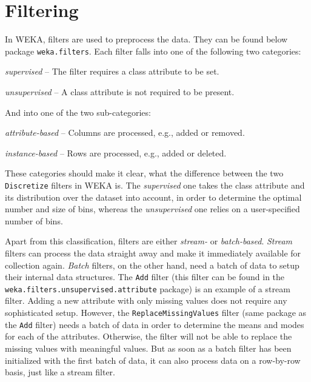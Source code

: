 \newpage

\section{Filtering}
\label{api_filtering}
In WEKA, filters are used to preprocess the data. They can be found below
package \texttt{weka.filters}. Each filter falls into one of the following two
categories:
\begin{tight_itemize}
	\item \textit{supervised} -- The filter requires a class attribute to be
set.
	\item \textit{unsupervised} -- A class attribute is not required to be
present.
\end{tight_itemize}
And into one of the two sub-categories:
\begin{tight_itemize}
	\item \textit{attribute-based} -- Columns are processed, e.g., added or
removed.
	\item \textit{instance-based} -- Rows are processed, e.g., added or deleted.
\end{tight_itemize}
These categories should make it clear, what the difference between the two
\texttt{Discretize} filters in WEKA is. The \textit{supervised} one takes the
class attribute and its distribution over the dataset into account, in order to
determine the optimal number and size of bins, whereas the
\textit{unsupervised} one relies on a user-specified number of bins.

Apart from this classification, filters are either \textit{stream-} or
\textit{batch-based}. \textit{Stream} filters can process the data straight away
and make it immediately available for collection again. \textit{Batch} filters,
on the other hand, need a batch of data to setup their internal
data structures. The \texttt{Add} filter (this filter can be found in the
\texttt{weka.filters.unsupervised.attribute} package) is an example of a stream
filter. Adding a new attribute with only missing values does not require any
sophisticated setup. However, the \texttt{ReplaceMissingValues} filter (same
package as the \texttt{Add} filter) needs a batch of data in order to determine
the means and modes for each of the attributes. Otherwise, the filter will not
be able to replace the missing values with meaningful values. But as soon as a
batch filter has been initialized with the first batch of data, it can also
process data on a row-by-row basis, just like a stream filter.

